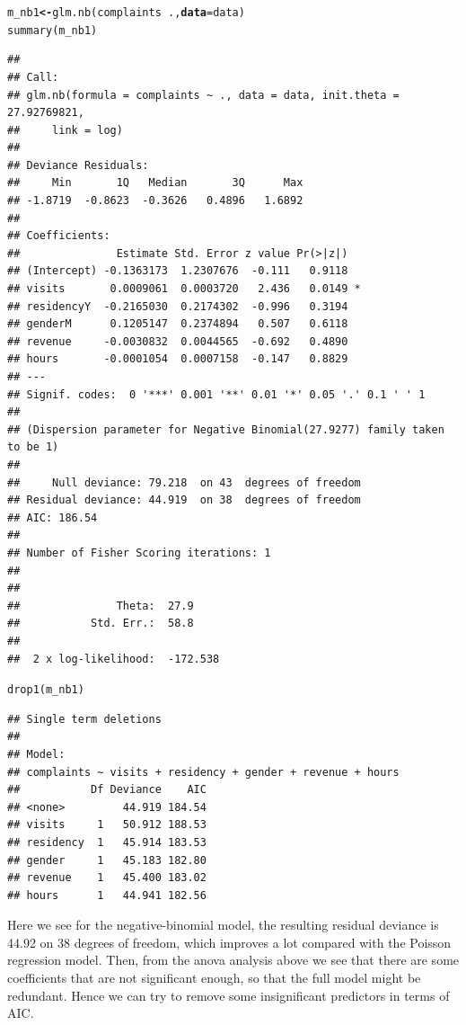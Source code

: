 \documentclass[12pt,oneside,a4paper]{article}\usepackage[]{graphicx}\usepackage[]{xcolor}
\makeatletter
\newcommand{\hlopt}[1]{\textcolor[rgb]{0,0,0}{#1}}%
\newcommand{\hlstd}[1]{\textcolor[rgb]{0,0,0}{#1}}%
\newcommand{\hlkwb}[1]{\textcolor[rgb]{0.498,0,0.333}{\textbf{#1}}}%
\newcommand{\hlkwc}[1]{\textcolor[rgb]{0.498,0,0.333}{\textbf{#1}}}%
\newcommand{\hlkwd}[1]{\textcolor[rgb]{0,0,0}{#1}}%
\newenvironment{kframe}{%
 \def\at@end@of@kframe{}%
 \ifinner\ifhmode%
  \def\at@end@of@kframe{\end{minipage}}%
  \begin{minipage}{\columnwidth}%
 \fi\fi%
 \def\FrameCommand##1{\hskip\@totalleftmargin \hskip-\fboxsep
 \colorbox{shadecolor}{##1}\hskip-\fboxsep
     \hskip-\linewidth \hskip-\@totalleftmargin \hskip\columnwidth}%
 \MakeFramed {\advance\hsize-\width
   \@totalleftmargin\z@ \linewidth\hsize
   \@setminipage}}%
 {\par\unskip\endMakeFramed%
 \at@end@of@kframe}
\newenvironment{knitrout}{}{} %
\makeatother
\begin{document}
\begin{knitrout}
\color{fgcolor}\begin{kframe}
\begin{alltt}
\hlstd{m_nb1} \hlkwb{<-} \hlkwd{glm.nb}\hlstd{(complaints} \hlopt{~} \hlstd{.,} \hlkwc{data} \hlstd{= data)}
\hlkwd{summary}\hlstd{(m_nb1)}
\end{alltt}
\begin{verbatim}
## 
## Call:
## glm.nb(formula = complaints ~ ., data = data, init.theta = 27.92769821, 
##     link = log)
## 
## Deviance Residuals: 
##     Min       1Q   Median       3Q      Max  
## -1.8719  -0.8623  -0.3626   0.4896   1.6892  
## 
## Coefficients:
##               Estimate Std. Error z value Pr(>|z|)  
## (Intercept) -0.1363173  1.2307676  -0.111   0.9118  
## visits       0.0009061  0.0003720   2.436   0.0149 *
## residencyY  -0.2165030  0.2174302  -0.996   0.3194  
## genderM      0.1205147  0.2374894   0.507   0.6118  
## revenue     -0.0030832  0.0044565  -0.692   0.4890  
## hours       -0.0001054  0.0007158  -0.147   0.8829  
## ---
## Signif. codes:  0 '***' 0.001 '**' 0.01 '*' 0.05 '.' 0.1 ' ' 1
## 
## (Dispersion parameter for Negative Binomial(27.9277) family taken to be 1)
## 
##     Null deviance: 79.218  on 43  degrees of freedom
## Residual deviance: 44.919  on 38  degrees of freedom
## AIC: 186.54
## 
## Number of Fisher Scoring iterations: 1
## 
## 
##               Theta:  27.9 
##           Std. Err.:  58.8 
## 
##  2 x log-likelihood:  -172.538
\end{verbatim}
\begin{alltt}
\hlkwd{drop1}\hlstd{(m_nb1)}
\end{alltt}
\begin{verbatim}
## Single term deletions
## 
## Model:
## complaints ~ visits + residency + gender + revenue + hours
##           Df Deviance    AIC
## <none>         44.919 184.54
## visits     1   50.912 188.53
## residency  1   45.914 183.53
## gender     1   45.183 182.80
## revenue    1   45.400 183.02
## hours      1   44.941 182.56
\end{verbatim}
\end{kframe}
\end{knitrout}

Here we see for the negative-binomial model, the resulting residual deviance is 44.92 on 38 degrees of freedom, which improves a lot compared with the Poisson regression model. Then, from the anova analysis above we see that there are some coefficients that are not significant enough, so that the full model might be redundant. Hence we can try to remove some insignificant predictors in terms of AIC.
\end{document}
